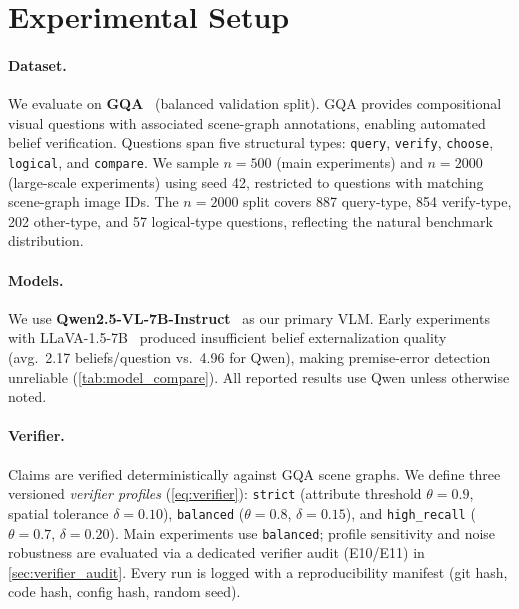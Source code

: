 \section{Experimental Setup}
\label{sec:experiments}

\paragraph{Dataset.}
We evaluate on \textbf{GQA}~\cite{hudson2019gqa} (balanced validation split). GQA
provides compositional visual questions with associated scene-graph annotations,
enabling automated belief verification. Questions span five structural types:
\texttt{query}, \texttt{verify}, \texttt{choose}, \texttt{logical}, and
\texttt{compare}. We sample $n{=}500$ (main experiments) and $n{=}2000$ (large-scale
experiments) using seed 42, restricted to questions with matching scene-graph image
IDs. The $n{=}2000$ split covers 887 query-type, 854 verify-type, 202 other-type,
and 57 logical-type questions, reflecting the natural benchmark distribution.

\paragraph{Models.}
We use \textbf{Qwen2.5-VL-7B-Instruct}~\cite{bai2025qwen} as our primary VLM. Early
experiments with LLaVA-1.5-7B~\cite{liu2023visual} produced insufficient belief
externalization quality (avg.\ 2.17 beliefs/question vs.\ 4.96 for Qwen), making
premise-error detection unreliable (\cref{tab:model_compare}). All reported results
use Qwen unless otherwise noted.

\paragraph{Verifier.}
Claims are verified deterministically against GQA scene graphs. We define three
versioned \emph{verifier profiles} (\cref{eq:verifier}): \texttt{strict}
(attribute threshold $\theta{=}0.9$, spatial tolerance $\delta{=}0.10$),
\texttt{balanced} ($\theta{=}0.8$, $\delta{=}0.15$), and \texttt{high\_recall}
($\theta{=}0.7$, $\delta{=}0.20$).
Main experiments use \texttt{balanced}; profile sensitivity and noise robustness
are evaluated via a dedicated verifier audit (E10/E11) in \cref{sec:verifier_audit}.
Every run is logged with a reproducibility manifest (git hash, code hash, config
hash, random seed).

